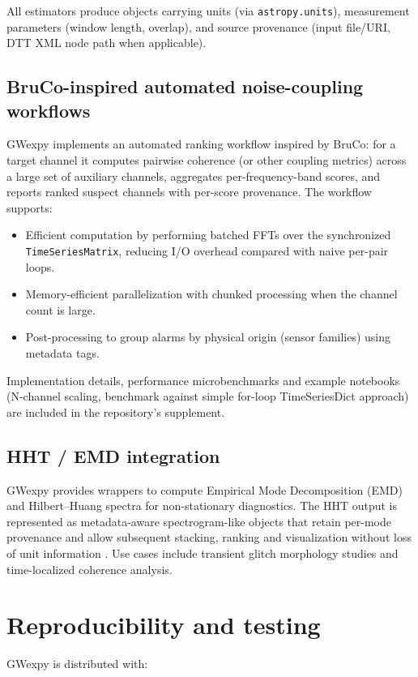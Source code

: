 \documentclass[preprint,12pt,a4paper]{elsarticle}
\begin{document}
All estimators produce objects carrying units (via \texttt{astropy.units}), measurement parameters (window length, overlap), and source provenance (input file/URI, DTT XML node path when applicable).

\subsection{BruCo-inspired automated noise-coupling workflows}
GWexpy implements an automated ranking workflow inspired by BruCo: for a target channel it computes pairwise coherence (or other coupling metrics) across a large set of auxiliary channels, aggregates per-frequency-band scores, and reports ranked suspect channels with per-score provenance.  The workflow supports:

\begin{itemize}
  \item Efficient computation by performing batched FFTs over the synchronized \texttt{TimeSeriesMatrix}, reducing I/O overhead compared with naive per-pair loops.
  \item Memory-efficient parallelization with chunked processing when the channel count is large.
  \item Post-processing to group alarms by physical origin (sensor families) using metadata tags.
\end{itemize}

Implementation details, performance microbenchmarks and example notebooks (N-channel scaling, benchmark against simple for-loop TimeSeriesDict approach) are included in the repository's supplement.

\subsection{HHT / EMD integration}
GWexpy provides wrappers to compute Empirical Mode Decomposition (EMD) and Hilbert--Huang spectra for non-stationary diagnostics.  The HHT output is represented as metadata-aware spectrogram-like objects that retain per-mode provenance and allow subsequent stacking, ranking and visualization without loss of unit information \cite{huang1998emd}.  Use cases include transient glitch morphology studies and time-localized coherence analysis.

\section{Reproducibility and testing}
\label{sec:repro}
GWexpy is distributed with:
\end{document}
